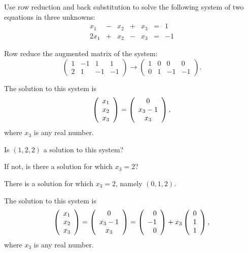 \documentclass{ximera}
\begin{document}
\begin{exercise} \label{c2.3.9}
Use row reduction and back substitution to solve the following
system of two equations in three unknowns:
\[
\begin{array}{rcrcrcrc}
 x_1 & - & x_2 & + & x_3 & = & 1 \\
2x_1 & + & x_2 & - & x_3 & = & -1
\end{array}
\]
\begin{hint}
   Row reduce the augmented matrix of the system:
\[
\left(\begin{array}{rrr|r} 1 & -1 & 1 & 1 \\ 2 & 1 & -1 & -1\end{array}\right)
\longrightarrow
\left(\begin{array}{rrr|r} 1 & 0 & 0 & 0 \\ 0 & 1 & -1 & -1\end{array}\right).
\]
\end{hint}
\begin{prompt}
  The solution to this system is
\[
\left(\begin{array}{c} x_1 \\ x_2 \\ x_3\end{array}\right) =
\left(\begin{array}{c} {0} \\ x_3 - {1} \\ x_3\end{array}\right),
\]
where $x_3$ is any real number.
\end{prompt}
Is $(1,2,2)$ a solution to this system?
\begin{multipleChoice}
\end{multipleChoice}
If not, is there a solution for which $x_3=2$?
\begin{multipleChoice}
\end{multipleChoice}
\begin{hint}
  There is a solution for which $x_3 = 2$, namely $(0,1,2)$.
\end{hint}

\begin{solution}

\ans The solution to this system is
\[
\left(\begin{array}{c} x_1 \\ x_2 \\ x_3\end{array}\right) =
\left(\begin{array}{c} 0 \\ x_3 - 1 \\ x_3\end{array}\right) = \left(\begin{array}{rrrrrrrrrrrrrrrrrr} 0 \\ -1 \\ 0 \end{array}\right) + x_3\left(\begin{array}{rrrrrrrrrrrrrrrrrr} 0 \\ 1 \\ 1 \end{array}\right),
\]
where $x_3$ is any real number.


\end{solution}
\end{exercise}
\end{document}
